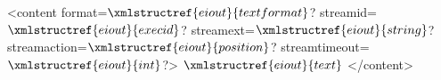 <content format=$\xmlstructref{eiout}{textformat}$? streamid=$\xmlstructref{eiout}{execid}$? streamext=$\xmlstructref{eiout}{string}$? streamaction=$\xmlstructref{eiout}{position}$? streamtimeout=$\xmlstructref{eiout}{int}$?>
  $\xmlstructref{eiout}{text}$
</content>
